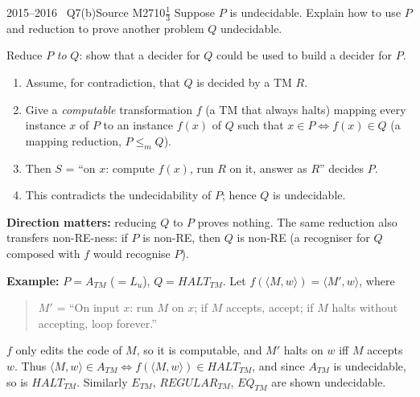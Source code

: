 \documentclass[11pt,a4paper]{article}
\begin{document}
\begin{question}{2015--2016 \textbullet\ Q7(b)}{Source M27}{10$\tfrac13$}
Suppose $P$ is undecidable. Explain how to use $P$ and reduction to prove another problem $Q$ undecidable.
\end{question}
\begin{solution}
Reduce $P$ \emph{to} $Q$: show that a decider for $Q$ could be used to build a decider for $P$.
\begin{enumerate}
\item Assume, for contradiction, that $Q$ is decided by a TM $R$.
\item Give a \emph{computable} transformation $f$ (a TM that always halts) mapping every instance $x$ of $P$ to an instance $f(x)$ of $Q$ such that $x\in P\iff f(x)\in Q$ (a mapping reduction, $P\le_mQ$).
\item Then $S$ = ``on $x$: compute $f(x)$, run $R$ on it, answer as $R$'' decides $P$.
\item This contradicts the undecidability of $P$; hence $Q$ is undecidable.
\end{enumerate}
\textbf{Direction matters:} reducing $Q$ to $P$ proves nothing. The same reduction also transfers non-RE-ness: if $P$ is non-RE, then $Q$ is non-RE (a recogniser for $Q$ composed with $f$ would recognise $P$).

\textbf{Example:} $P=A_{TM}$ ($=L_u$), $Q=\mathit{HALT}_{TM}$. Let $f(\langle M,w\rangle)=\langle M',w\rangle$, where
\begin{quote}
$M'$ = ``On input $x$: run $M$ on $x$; if $M$ accepts, accept; if $M$ halts without accepting, loop forever.''
\end{quote}
$f$ only edits the code of $M$, so it is computable, and $M'$ halts on $w$ iff $M$ accepts $w$. Thus $\langle M,w\rangle\in A_{TM}\iff f(\langle M,w\rangle)\in\mathit{HALT}_{TM}$, and since $A_{TM}$ is undecidable, so is $\mathit{HALT}_{TM}$. Similarly $E_{TM}$, $\mathit{REGULAR}_{TM}$, $EQ_{TM}$ are shown undecidable.
\end{solution}
\end{document}
